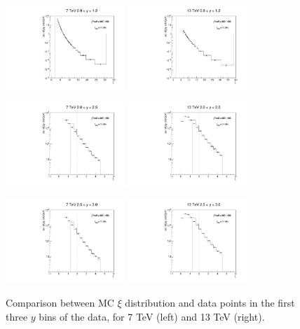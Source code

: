 \documentclass{article}
\begin{document}
\clearpage

\begin{figure}[h!]
\centering
\includegraphics[width = 0.4\textwidth]{xi_7_y4.pdf}
\includegraphics[width = 0.4\textwidth]{xi_13_y4.pdf}

\includegraphics[width = 0.4\textwidth]{xi_7_y5.pdf}
\includegraphics[width = 0.4\textwidth]{xi_13_y5.pdf}

\includegraphics[width = 0.4\textwidth]{xi_7_y6.pdf}
\includegraphics[width = 0.4\textwidth]{xi_13_y6.pdf}
\caption{Comparison between MC $\xi$ distribution and data points in the first three $y$ bins of the data, for 7 TeV (left) and 13 TeV (right).}\label{f:xi_comp_2}
\end{figure}
\end{document}
